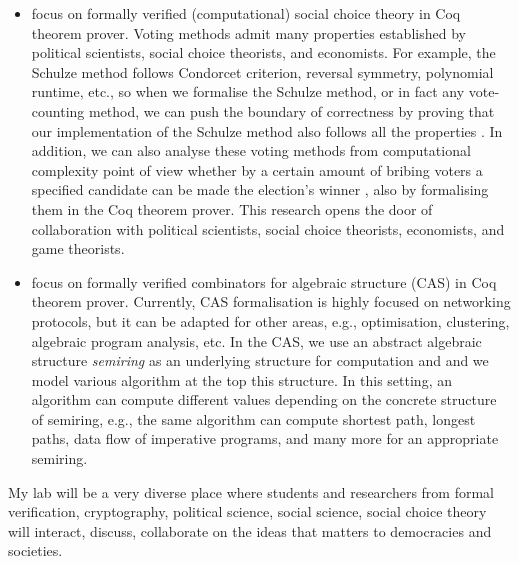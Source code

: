 \documentclass[a4paper]{article}
\begin{document}
\begin{itemize}
\item focus on formally verified (computational) social choice theory in Coq theorem prover. 
	Voting methods admit many properties established by political scientists, social choice theorists, 
	and economists. For example, the Schulze method follows Condorcet criterion, reversal symmetry,
	polynomial runtime, etc., so when we formalise the Schulze method, or in fact any vote-counting method, 
	we can push the boundary of correctness by proving that our 
	implementation of the Schulze method also follows all the properties \cite{tiwari2021machine}. 
	In addition, we can also analyse these voting
	methods from computational complexity point of view whether by a certain amount of bribing
	voters a specified candidate can be made the election's winner \cite{faliszewski2006complexity},
	also by formalising them in the Coq theorem prover. 
	This research opens the door of collaboration with political scientists, 
	social choice theorists, economists, and game theorists.

\item focus on formally verified combinators for algebraic structure (CAS) in Coq theorem prover. 
	Currently, CAS formalisation is highly focused on networking protocols, but it can be 
	adapted for other areas, e.g., optimisation, clustering, algebraic program 
	analysis, etc. In the CAS, we use an abstract algebraic structure 
	\emph{semiring} as an underlying structure
	for computation and and we model various algorithm at the top this 
	structure. In this setting, an algorithm can compute different values depending 
	on the concrete structure of semiring, e.g., the same algorithm 
	can compute shortest path, longest paths, 
	data flow of imperative programs, and many more \cite{gondran2008graphs} 
	for an appropriate semiring.
	

\end{itemize}

My lab will be a very diverse place where students and researchers from formal 
verification, cryptography, 
political science, social science, social choice theory will interact, discuss, 
collaborate on the ideas that matters to democracies and societies.


 

\end{document}

